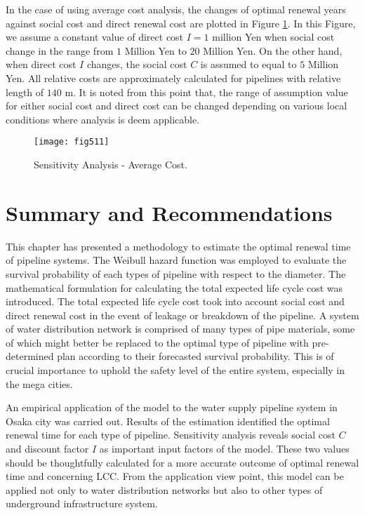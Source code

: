 In the case of using average cost analysis, the changes of optimal renewal years against social cost and direct renewal cost are plotted in Figure \ref{fig511}. In this Figure, we assume a constant value of direct cost $I=1$ million Yen when social cost change in the range from $1$ Million Yen to $20$ Million Yen. On the other hand, when direct cost $I$ changes, the social cost $C$ is assumed to equal to $5$ Million Yen. All relative costs are approximately calculated for pipelines with relative length of $140$ m. It is noted from this point that, the range of assumption value for either social cost and direct cost can be changed depending on various local conditions where analysis is deem applicable.
\begin{figure}[t]
\begin{center}
\texttt{[image: fig511]} 
\end{center}
\caption{Sensitivity Analysis - Average Cost.}
\label{fig511} 
\end{figure}
\section{Summary and Recommendations}
\label{59}
This chapter has presented a methodology to estimate the optimal renewal time of pipeline systems. The Weibull hazard function was employed to evaluate the survival probability of each types of pipeline with respect to the diameter. The mathematical formulation for calculating the total expected life cycle cost was introduced. The total expected life cycle cost took into account social cost and direct renewal cost in the event of leakage or breakdown of the pipeline. A system of water distribution network is comprised of many types of pipe materials, some of which might better be replaced to the optimal type of pipeline with pre-determined plan according to their forecasted survival probability. This is of crucial importance to uphold the safety level of the entire system, especially in the mega cities. 

An empirical application of the model to the water supply pipeline system in Osaka city was carried out. Results of the estimation identified the optimal renewal time for each type of pipeline. Sensitivity analysis reveals social cost $C$ and discount factor $I$ as important input factors of the model. These two values should be thoughtfully calculated for a more accurate outcome of optimal renewal time and concerning LCC. From the application view point, this model can be applied not only to water distribution networks but also to other types of underground infrastructure system.